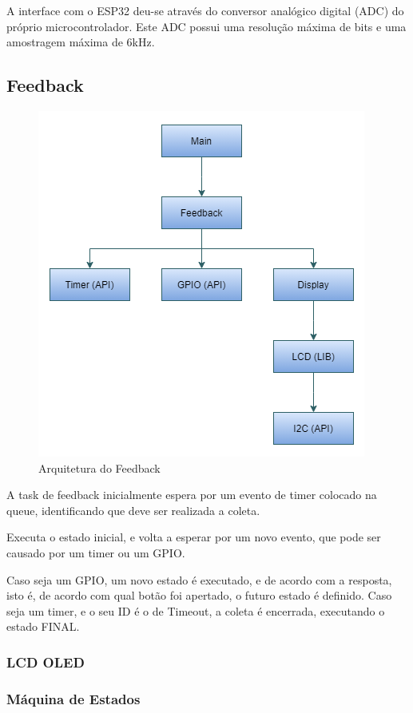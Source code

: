 \documentclass[../monografia.tex]{subfiles}
\begin{document}
A interface com o ESP32 deu-se através do conversor analógico digital (ADC) do próprio microcontrolador. Este ADC possui uma resolução máxima de 
bits e uma amostragem máxima de 6kHz. 

\subsection{Feedback}

\begin{figure}[h]
	\centering
	\includegraphics[]{feedback-arch}
	\caption{Arquitetura do Feedback}
	\label{fig:feedback-arch}
\end{figure}

A task de feedback inicialmente espera por um evento de timer colocado na queue, identificando que deve ser realizada a coleta. 

Executa o estado inicial, e volta a esperar por um novo evento, que pode ser causado por um timer ou um GPIO. 

Caso seja um GPIO, um novo estado é executado, e de acordo com a resposta, isto é, de acordo com qual botão foi apertado, o futuro estado é definido. 
Caso seja um timer, e o seu ID é o de Timeout, a coleta é encerrada, executando o estado FINAL. 

\subsubsection{LCD OLED}
\subsubsection{Máquina de Estados}
\end{document}
